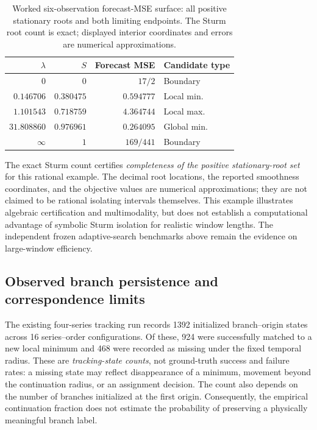 \documentclass[english]{smcca}
\begin{document}
\begin{table}[t]
\centering
\caption{Worked six-observation forecast-MSE surface:
all positive stationary roots and both limiting endpoints.
The Sturm root count is exact; displayed interior
coordinates and errors are numerical approximations.}
\label{tab:sturm_example}
\begin{tabular}{@{}rrrl@{}}
\toprule
$\lambda$ & $S$ & Forecast MSE & Candidate type\\
\midrule
$0$ & $0$ & $17/2$ & Boundary\\
$0.146706$ & $0.380475$ & $0.594777$ & Local min.\\
$1.101543$ & $0.718759$ & $4.364744$ & Local max.\\
$31.808860$ & $0.976961$ & $\mathbf{0.264095}$ & Global min.\\
$\infty$ & $1$ & $169/441$ & Boundary\\
\bottomrule
\end{tabular}
\end{table} The exact Sturm count certifies
\emph{completeness of the positive stationary-root set}
for this rational example. The decimal root locations,
the reported smoothness coordinates, and the objective
values are numerical approximations; they are not
claimed to be rational isolating intervals themselves.
This example illustrates algebraic certification and
multimodality, but does not establish a computational
advantage of symbolic Sturm isolation for realistic
window lengths. The independent frozen adaptive-search
benchmarks above remain the evidence on large-window
efficiency.

\subsection{Observed branch persistence and correspondence limits}
\label{sec:tracking_results}

The existing four-series tracking run records 1392 initialized
branch--origin states across 16 series--order configurations. Of these,
924 were successfully matched to a new local minimum and 468 were
recorded as missing under the fixed temporal radius. These are
\emph{tracking-state counts}, not ground-truth success and failure rates:
a missing state may reflect disappearance of a minimum, movement beyond
the continuation radius, or an assignment decision. The count also
depends on the number of branches initialized at the first origin.
Consequently, the empirical continuation fraction does not estimate
the probability of preserving a physically meaningful branch label.
\end{document}
